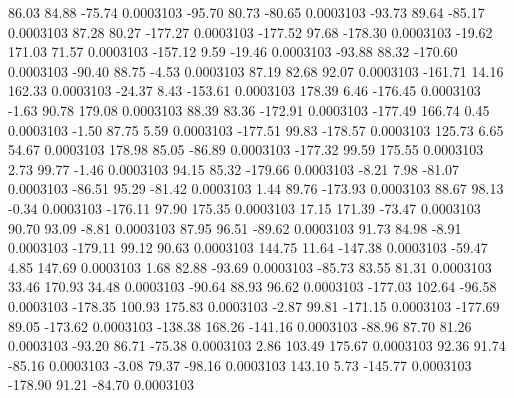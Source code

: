        86.03       84.88      -75.74     0.0003103
      -95.70       80.73      -80.65     0.0003103
      -93.73       89.64      -85.17     0.0003103
       87.28       80.27     -177.27     0.0003103
     -177.52       97.68     -178.30     0.0003103
      -19.62      171.03       71.57     0.0003103
     -157.12        9.59      -19.46     0.0003103
      -93.88       88.32     -170.60     0.0003103
      -90.40       88.75       -4.53     0.0003103
       87.19       82.68       92.07     0.0003103
     -161.71       14.16      162.33     0.0003103
      -24.37        8.43     -153.61     0.0003103
      178.39        6.46     -176.45     0.0003103
       -1.63       90.78      179.08     0.0003103
       88.39       83.36     -172.91     0.0003103
     -177.49      166.74        0.45     0.0003103
       -1.50       87.75        5.59     0.0003103
     -177.51       99.83     -178.57     0.0003103
      125.73        6.65       54.67     0.0003103
      178.98       85.05      -86.89     0.0003103
     -177.32       99.59      175.55     0.0003103
        2.73       99.77       -1.46     0.0003103
       94.15       85.32     -179.66     0.0003103
       -8.21        7.98      -81.07     0.0003103
      -86.51       95.29      -81.42     0.0003103
        1.44       89.76     -173.93     0.0003103
       88.67       98.13       -0.34     0.0003103
     -176.11       97.90      175.35     0.0003103
       17.15      171.39      -73.47     0.0003103
       90.70       93.09       -8.81     0.0003103
       87.95       96.51      -89.62     0.0003103
       91.73       84.98       -8.91     0.0003103
     -179.11       99.12       90.63     0.0003103
      144.75       11.64     -147.38     0.0003103
      -59.47        4.85      147.69     0.0003103
        1.68       82.88      -93.69     0.0003103
      -85.73       83.55       81.31     0.0003103
       33.46      170.93       34.48     0.0003103
      -90.64       88.93       96.62     0.0003103
     -177.03      102.64      -96.58     0.0003103
     -178.35      100.93      175.83     0.0003103
       -2.87       99.81     -171.15     0.0003103
     -177.69       89.05     -173.62     0.0003103
     -138.38      168.26     -141.16     0.0003103
      -88.96       87.70       81.26     0.0003103
      -93.20       86.71      -75.38     0.0003103
        2.86      103.49      175.67     0.0003103
       92.36       91.74      -85.16     0.0003103
       -3.08       79.37      -98.16     0.0003103
      143.10        5.73     -145.77     0.0003103
     -178.90       91.21      -84.70     0.0003103
